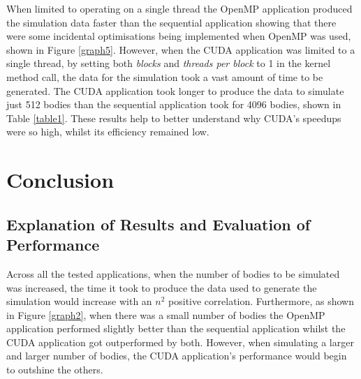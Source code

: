 \documentclass[12pt,journal,transmag]{IEEEtran}
\begin{document}
	When limited to operating on a single thread the OpenMP application produced the simulation data faster than the sequential application showing that there were some incidental optimisations being implemented when OpenMP was used, shown in Figure \ref{graph5}. However, when the CUDA application was limited to a single thread, by setting both \textit{blocks} and \textit{threads per block} to 1 in the kernel method call, the data for the simulation took a vast amount of time to be generated. The CUDA application took longer to produce the data to simulate just 512 bodies than the sequential application took for 4096 bodies, shown in Table \ref{table1}. These results help to better understand why CUDA's speedups were so high, whilst its efficiency remained low.
	
	\section{Conclusion}
	\subsection{Explanation of Results and Evaluation of Performance}
	Across all the tested applications, when the number of bodies to be simulated was increased, the time it took to produce the data used to generate the simulation would increase with an $n^2$ positive correlation. Furthermore, as shown in Figure \ref{graph2}, when there was a small number of bodies the OpenMP application performed slightly better than the sequential application whilst the CUDA application got outperformed by both. However, when simulating a larger and larger number of bodies, the CUDA application's performance would begin to outshine the others.
	
\end{document}
